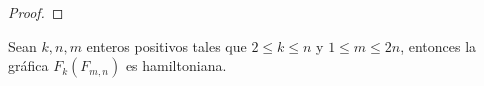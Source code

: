 \begin{proof}
             

    
\end{proof}


    \begin{teorema}
        Sean $k, n, m$ enteros positivos tales que $2 \leq k \leq n$ y $1 \leq m
        \leq 2n$, entonces la gr\'afica $F_k(F_{m,n})$ es hamiltoniana.
    \end{teorema}

